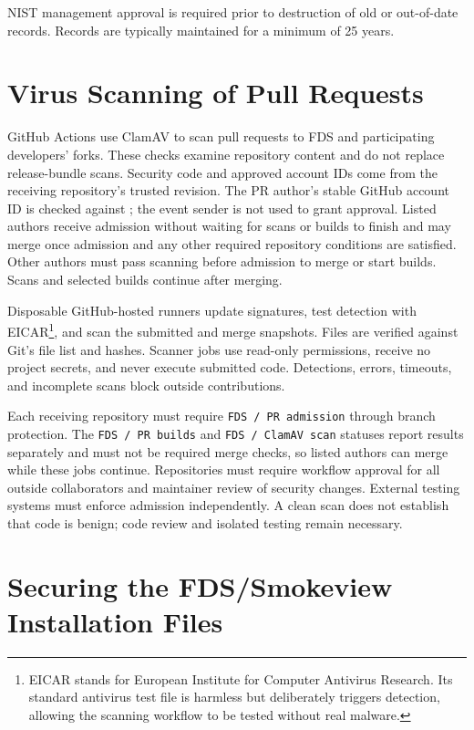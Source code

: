 \documentclass[11pt]{book}
\begin{document}
NIST management approval is required prior to destruction of old or out-of-date records. Records are typically maintained for a minimum of 25 years.

\section{Virus Scanning of Pull Requests}
\label{sec:pr-virus-scanning}

GitHub Actions use ClamAV to scan pull requests to FDS and participating developers' forks. These checks examine repository content and do not replace release-bundle scans. Security code and approved account IDs come from the receiving repository's trusted revision. The PR author's stable GitHub account ID is checked against ; the event sender is not used to grant approval. Listed authors receive admission without waiting for scans or builds to finish and may merge once admission and any other required repository conditions are satisfied. Other authors must pass scanning before admission to merge or start builds. Scans and selected builds continue after merging.

Disposable GitHub-hosted runners update signatures, test detection with EICAR\footnote{EICAR stands for European Institute for Computer Antivirus Research. Its standard antivirus test file is harmless but deliberately triggers detection, allowing the scanning workflow to be tested without real malware.}, and scan the submitted and merge snapshots. Files are verified against Git's file list and hashes. Scanner jobs use read-only permissions, receive no project secrets, and never execute submitted code. Detections, errors, timeouts, and incomplete scans block outside contributions.

Each receiving repository must require \texttt{FDS / PR admission} through branch protection. The \texttt{FDS / PR builds} and \texttt{FDS / ClamAV scan} statuses report results separately and must not be required merge checks, so listed authors can merge while these jobs continue. Repositories must require workflow approval for all outside collaborators and maintainer review of security changes. External testing systems must enforce admission independently. A clean scan does not establish that code is benign; code review and isolated testing remain necessary.

\section{Securing the FDS/Smokeview Installation Files}
\end{document}
